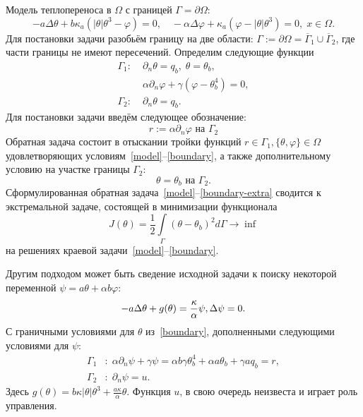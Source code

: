 Модель теплопереноса в $\Omega$ с границей $\Gamma = \partial \Omega$:
\begin{equation}
    \label{model}
    - a \Delta\theta + b\kappa_a(|\theta|\theta^3- \varphi)=0,   \quad
    - \alpha \Delta \varphi + \kappa_a(\varphi-|\theta|\theta^3)=0,\; x\in\Omega.
\end{equation}
Для постановки задачи разобьём границу на две области:
$\Gamma := \partial \Omega =\overline{\Gamma}_1 \cup \overline{\Gamma}_2$,
где части границы не имеют пересечений.
Определим следующие функции
\begin{equation}
    \label{boundary}
    \begin{aligned}
        \Gamma_1 :\; &\partial_n \theta = q_b,\; \theta = \theta_b, \\
        &\alpha\partial_n\varphi + \gamma (\varphi - \theta_b ^4 ) = 0, \\
        \Gamma_2 :\; & \partial_n \theta = q_b.
    \end{aligned}
\end{equation}
Для постановки задачи введём следующее обозначение:
\[
    r:= \alpha \partial_n \varphi \text{ на }\Gamma_2
\]
Обратная задача состоит в отыскании тройки функций $r \in  \Gamma_1, \{\theta, \varphi\} \in \Omega $
удовлетворяющих условиям~\eqref{model}--\eqref{boundary}, а также дополнительному условию
на участке границы $\Gamma_2$:
\begin{equation}
    \label{boundary-extra}
    \theta = \theta_b \text{ на } \Gamma_2.
\end{equation}
Сформулированная обратная задача~\eqref{model}--\eqref{boundary-extra} сводится к экстремальной задаче,
состоящей в минимизации функционала
\begin{equation}
    \label{cost}
    J(\theta) = \frac{1}{2}\int\limits_\Gamma (\theta - \theta_b)^{2} d\Gamma \rightarrow \inf
\end{equation}
на решениях краевой задачи~\eqref{model}--\eqref{boundary}.


Другим подходом может быть сведение исходной задачи к поиску некоторой
переменной $\psi = a\theta + \alpha b \varphi$:
\begin{equation}
    \label{eq:equation}
    -a \Delta \theta + g (\theta) = \frac{\kappa}{\alpha}\psi, \\
    \Delta \psi = 0.
\end{equation}
С граничными условиями для $\theta$ из~\eqref{boundary}, дополненными следующими условиями для
$\psi$:
\begin{equation}
    \label{eq:boundary-2}
    \begin{aligned}
        \Gamma_1 &: \; \alpha \partial_n \psi + \gamma \psi = \alpha b \gamma \theta_b^4 + \alpha a \theta_b + \gamma a q_b = r, \\
        \Gamma_2 &: \; \partial_n \psi = u.
    \end{aligned}
\end{equation}
Здесь $g(\theta) = b \kappa|\theta|\theta^3 + \frac{a\kappa}{\alpha}\theta$.
Функция $u$, в свою очередь неизвеста и играет роль управления.